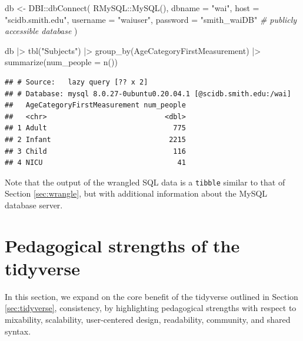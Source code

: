 \documentclass[12pt]{article}
\newenvironment{Shaded}{\begin{snugshade}}{\end{snugshade}}
\newcommand{\AttributeTok}[1]{\textcolor[rgb]{0.77,0.63,0.00}{#1}}
\newcommand{\CommentTok}[1]{\textcolor[rgb]{0.56,0.35,0.01}{\textit{#1}}}
\newcommand{\FunctionTok}[1]{\textcolor[rgb]{0.00,0.00,0.00}{#1}}
\newcommand{\NormalTok}[1]{#1}
\newcommand{\OtherTok}[1]{\textcolor[rgb]{0.56,0.35,0.01}{#1}}
\newcommand{\SpecialCharTok}[1]{\textcolor[rgb]{0.00,0.00,0.00}{#1}}
\newcommand{\StringTok}[1]{\textcolor[rgb]{0.31,0.60,0.02}{#1}}
\begin{document}
\linespread{1}

\begin{Shaded}
\begin{Highlighting}[]
\NormalTok{db }\OtherTok{\textless{}{-}}\NormalTok{ DBI}\SpecialCharTok{::}\FunctionTok{dbConnect}\NormalTok{(}
\NormalTok{  RMySQL}\SpecialCharTok{::}\FunctionTok{MySQL}\NormalTok{(),}
  \AttributeTok{dbname =} \StringTok{"wai"}\NormalTok{, }
  \AttributeTok{host =} \StringTok{"scidb.smith.edu"}\NormalTok{, }
  \AttributeTok{username =} \StringTok{"waiuser"}\NormalTok{, }
  \AttributeTok{password =} \StringTok{"smith\_waiDB"}  \CommentTok{\# publicly accessible database}
\NormalTok{)}

\NormalTok{db }\SpecialCharTok{|\textgreater{}}
  \FunctionTok{tbl}\NormalTok{(}\StringTok{"Subjects"}\NormalTok{) }\SpecialCharTok{|\textgreater{}} 
  \FunctionTok{group\_by}\NormalTok{(AgeCategoryFirstMeasurement) }\SpecialCharTok{|\textgreater{}}
  \FunctionTok{summarize}\NormalTok{(}\AttributeTok{num\_people =} \FunctionTok{n}\NormalTok{())}
\end{Highlighting}
\end{Shaded}

\begin{verbatim}
## # Source:   lazy query [?? x 2]
## # Database: mysql 8.0.27-0ubuntu0.20.04.1 [@scidb.smith.edu:/wai]
##   AgeCategoryFirstMeasurement num_people
##   <chr>                            <dbl>
## 1 Adult                              775
## 2 Infant                            2215
## 3 Child                              116
## 4 NICU                                41
\end{verbatim}


\label{SQL-ex} \linespread{2} \vspace{3mm}\setlength{\parindent}{15pt}

Note that the output of the wrangled SQL data is a \texttt{tibble}
similar to that of Section \ref{sec:wrangle}, but with additional
information about the MySQL database server.

\hypertarget{sec:teach}{%
\section{Pedagogical strengths of the tidyverse}\label{sec:teach}}

In this section, we expand on the core benefit of the tidyverse outlined
in Section \ref{sec:tidyverse}, consistency, by highlighting pedagogical
strengths with respect to mixability, scalability, user-centered design,
readability, community, and shared syntax.
\end{document}
